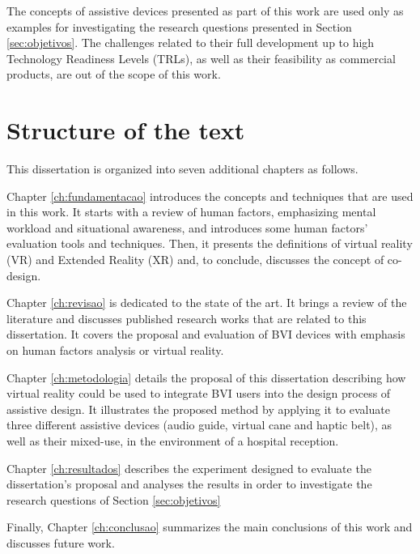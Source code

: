 The concepts of assistive devices presented as part of this work are used only as examples for investigating the research questions presented in Section \ref{sec:objetivos}. The challenges related to their full development up to high Technology Readiness Levels (TRLs), as well as their feasibility as commercial products, are out of the scope of this work.


\section{Structure of the text}

This dissertation is organized into seven additional chapters as follows.

Chapter \ref{ch:fundamentacao} introduces the concepts and techniques that are used in this work. It starts with a review of human factors, emphasizing mental workload and situational awareness, and introduces some human factors' evaluation tools and techniques. Then, it presents the definitions of virtual reality (VR) and Extended Reality (XR) and, to conclude, discusses the concept of co-design.

Chapter \ref{ch:revisao} is dedicated to the state of the art. It brings a review of the literature and discusses published research works that are related to this dissertation. It covers the proposal and evaluation of BVI devices with emphasis on human factors analysis or virtual reality.

Chapter \ref{ch:metodologia} details the proposal of this dissertation describing how virtual reality could be used to integrate BVI users into the design process of assistive design. It illustrates the proposed method by applying it to evaluate three different assistive devices (audio guide, virtual cane and haptic belt), as well as their mixed-use, in the environment of a hospital reception. 

Chapter \ref{ch:resultados} describes the experiment designed to evaluate the dissertation's proposal and analyses the results in order to investigate the research questions of Section \ref{sec:objetivos}

Finally, Chapter \ref{ch:conclusao} summarizes the main conclusions of this work and discusses future work.
